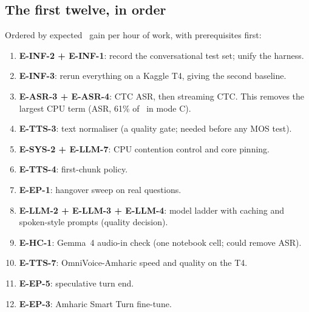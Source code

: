 \subsection{The first twelve, in order}
Ordered by expected \ttfa\ gain per hour of work, with prerequisites first:
\begin{enumerate}
  \item \textbf{E-INF-2 + E-INF-1}: record the conversational test set; unify the harness.
  \item \textbf{E-INF-3}: rerun everything on a Kaggle T4, giving the second baseline.
  \item \textbf{E-ASR-3 + E-ASR-4}: CTC ASR, then streaming CTC. This removes the largest CPU term (ASR, 61\% of \ttfa\ in mode C).
  \item \textbf{E-TTS-3}: text normaliser (a quality gate; needed before any MOS test).
  \item \textbf{E-SYS-2 + E-LLM-7}: CPU contention control and core pinning.
  \item \textbf{E-TTS-4}: first-chunk policy.
  \item \textbf{E-EP-1}: hangover sweep on real questions.
  \item \textbf{E-LLM-2 + E-LLM-3 + E-LLM-4}: model ladder with caching and spoken-style prompts (quality decision).
  \item \textbf{E-HC-1}: Gemma~4 audio-in check (one notebook cell; could remove ASR).
  \item \textbf{E-TTS-7}: OmniVoice-Amharic speed and quality on the T4.
  \item \textbf{E-EP-5}: speculative turn end.
  \item \textbf{E-EP-3}: Amharic Smart Turn fine-tune.
\end{enumerate}
